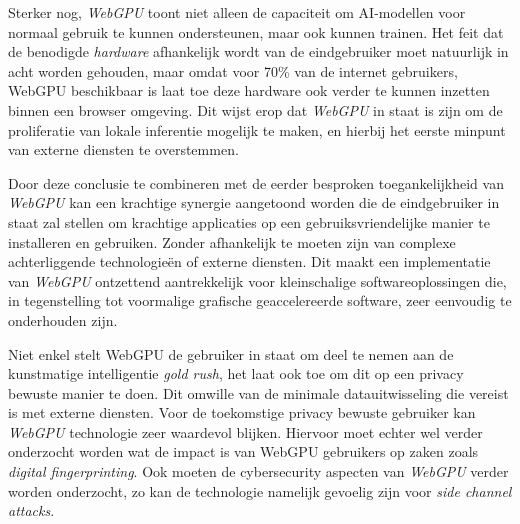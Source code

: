 \bigbreak{}

Sterker nog, \textit{WebGPU} toont niet alleen de capaciteit om  AI-modellen voor normaal gebruik te kunnen ondersteunen, maar ook kunnen trainen. Het feit dat de benodigde \textit{hardware} afhankelijk wordt van de eindgebruiker moet natuurlijk in acht worden gehouden, maar omdat voor 70\% van de internet gebruikers, WebGPU beschikbaar is laat toe deze hardware ook verder te kunnen inzetten binnen een browser omgeving. Dit wijst erop dat \textit{WebGPU} in staat is zijn om de proliferatie van lokale inferentie mogelijk te maken, en hierbij het eerste minpunt van externe diensten te overstemmen.

\bigbreak{}

Door deze conclusie te combineren met de eerder besproken toegankelijkheid van \textit{WebGPU} kan een krachtige synergie aangetoond worden die de eindgebruiker in staat zal stellen om krachtige applicaties op een gebruiksvriendelijke manier te installeren en gebruiken. Zonder afhankelijk te moeten zijn van complexe achterliggende technologieën of externe diensten. Dit maakt een implementatie van \textit{WebGPU} ontzettend aantrekkelijk voor kleinschalige softwareoplossingen die, in tegenstelling tot voormalige grafische geaccelereerde software, zeer eenvoudig te onderhouden zijn.


\bigbreak{}

Niet enkel stelt WebGPU de gebruiker in staat om deel te nemen aan de kunstmatige intelligentie \textit{gold rush}, het laat ook toe om dit op een privacy bewuste manier te doen. Dit omwille van de minimale datauitwisseling die vereist is met externe diensten. Voor de toekomstige privacy bewuste gebruiker kan \textit{WebGPU} technologie zeer waardevol blijken. Hiervoor moet echter wel verder onderzocht worden wat de impact is van WebGPU gebruikers op zaken zoals \textit{digital fingerprinting}. Ook moeten de cybersecurity aspecten van \textit{WebGPU} verder worden onderzocht, zo kan de technologie namelijk gevoelig zijn voor \textit{side channel attacks}.

\bigbreak{}
\iffalse
TODO Beschrijf dat er verder moet onderzocht worden welke apparaten in staat zijn welke modellen te kunnen ondersteunen, dat hier verder onderzoek naar moet worden uitgevoerd, en dat dit merkbaar was bij het uitvoeren van chatgpu.

- Ik heb gelezen dat WebGPU beschikbaar is voor desktops/laptops, maar ook in mobiele browsers. In hoeverre zijn de GPU's van al deze toestellen sterk genoeg? Is dit een aspect waar rekening moet mee gehouden worden bij het beschikbaar stellen van software die WebGPU gebruikt 
\fi


